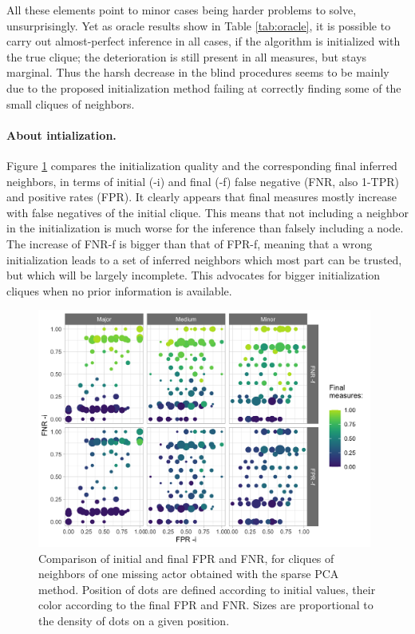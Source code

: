All these elements point to minor cases being harder problems to solve, unsurprisingly. Yet as oracle results show in Table \ref{tab:oracle}, it is possible to carry out almost-perfect inference in all cases, if the algorithm is initialized with the true clique; the deterioration is still present in all measures, but stays marginal. Thus the harsh decrease in the blind procedures seems to be mainly due to the proposed initialization method failing at correctly finding some of the small cliques of neighbors.\\


\paragraph{About intialization.}
Figure \ref{fig:perfinit} compares the initialization quality and the corresponding final inferred neighbors, in terms of initial (-i) and final (-f) false negative (FNR, also 1-TPR) and positive rates (FPR). It clearly appears that final measures  mostly increase with false negatives of the initial clique. This means that not including a neighbor in the initialization is much worse for the inference than falsely including a node. The increase of FNR-f is bigger than that of FPR-f, meaning that a wrong initialization leads to a set of inferred neighbors which most part can be trusted, but which will be largely incomplete. This advocates for bigger initialization cliques when no prior information is available.

\begin{figure}
    \centering    \includegraphics[width=11cm]{figs/quali_init_spca.png}
    \caption{Comparison of initial and final FPR and FNR, for cliques of neighbors of one missing actor obtained with the sparse PCA method. Position of dots are defined according to initial values, their color according to the final FPR and FNR. Sizes are proportional to the density of dots on a given position.}
    \label{fig:perfinit}
\end{figure}


